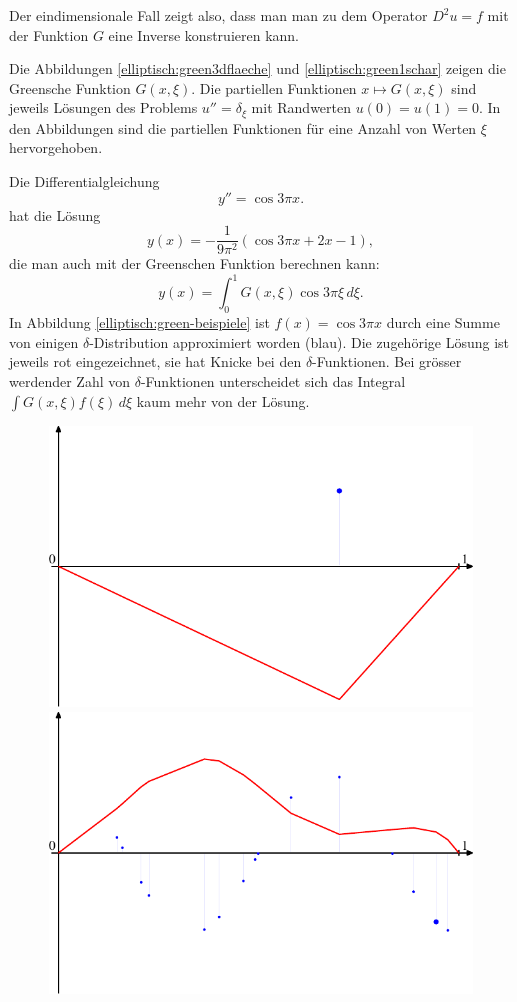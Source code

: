 Der eindimensionale Fall zeigt also, dass man man zu dem Operator $D^2u=f$
mit der Funktion $G$ eine Inverse konstruieren kann.

Die Abbildungen \ref{elliptisch:green3dflaeche} und
\ref{elliptisch:green1schar} zeigen die Greensche Funktion $G(x,\xi)$.
Die partiellen Funktionen $x\mapsto G(x,\xi)$ sind jeweils Lösungen
des Problems $u''=\delta_\xi$ mit Randwerten $u(0)=u(1)=0$.
In den Abbildungen sind die partiellen Funktionen für eine Anzahl
von Werten $\xi$ hervorgehoben.

\begin{beispiel}
Die Differentialgleichung
\[
y''=\cos 3\pi x.
\]
hat die Lösung
\[
y(x)=-\frac1{9\pi^2}(\cos 3\pi x + 2x - 1),
\]
die man auch mit der Greenschen Funktion berechnen kann:
\[
y(x)=\int_0^1 G(x,\xi)\cos 3\pi\xi\,d\xi.
\]
In Abbildung
\ref{elliptisch:green-beispiele}
ist $f(x)=\cos 3\pi x$ durch eine Summe von einigen $\delta$-Distribution
approximiert worden (blau).
Die zugehörige Lösung ist jeweils rot eingezeichnet, sie hat
Knicke bei den $\delta$-Funktionen. 
Bei grösser werdender Zahl von $\delta$-Funktionen unterscheidet sich
das Integral $\int G(x,\xi)f(\xi)\,d\xi$ kaum mehr von der Lösung.
\begin{figure}
\begin{center}
\includegraphics[width=0.7\hsize]{../common/graphics/green-1.pdf}\\
\includegraphics[width=0.7\hsize]{../common/graphics/green-324.pdf}\\

\end{center}
\end{figure}
\end{beispiel}
